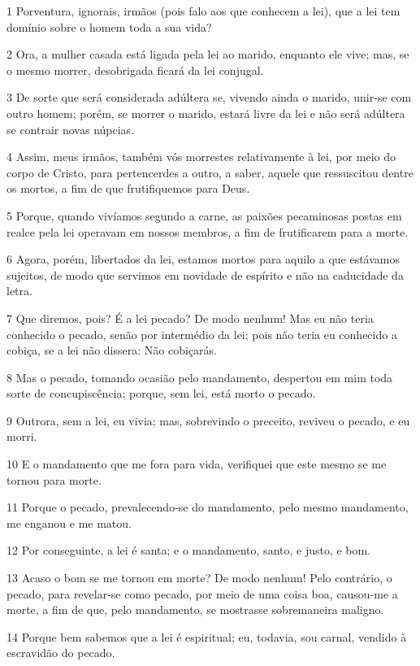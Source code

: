 \par 1 Porventura, ignorais, irmãos (pois falo aos que conhecem a lei), que a lei tem domínio sobre o homem toda a sua vida?
\par 2 Ora, a mulher casada está ligada pela lei ao marido, enquanto ele vive; mas, se o mesmo morrer, desobrigada ficará da lei conjugal.
\par 3 De sorte que será considerada adúltera se, vivendo ainda o marido, unir-se com outro homem; porém, se morrer o marido, estará livre da lei e não será adúltera se contrair novas núpcias.
\par 4 Assim, meus irmãos, também vós morrestes relativamente à lei, por meio do corpo de Cristo, para pertencerdes a outro, a saber, aquele que ressuscitou dentre os mortos, a fim de que frutifiquemos para Deus.
\par 5 Porque, quando vivíamos segundo a carne, as paixões pecaminosas postas em realce pela lei operavam em nossos membros, a fim de frutificarem para a morte.
\par 6 Agora, porém, libertados da lei, estamos mortos para aquilo a que estávamos sujeitos, de modo que servimos em novidade de espírito e não na caducidade da letra.
\par 7 Que diremos, pois? É a lei pecado? De modo nenhum! Mas eu não teria conhecido o pecado, senão por intermédio da lei; pois não teria eu conhecido a cobiça, se a lei não dissera: Não cobiçarás.
\par 8 Mas o pecado, tomando ocasião pelo mandamento, despertou em mim toda sorte de concupiscência; porque, sem lei, está morto o pecado.
\par 9 Outrora, sem a lei, eu vivia; mas, sobrevindo o preceito, reviveu o pecado, e eu morri.
\par 10 E o mandamento que me fora para vida, verifiquei que este mesmo se me tornou para morte.
\par 11 Porque o pecado, prevalecendo-se do mandamento, pelo mesmo mandamento, me enganou e me matou.
\par 12 Por conseguinte, a lei é santa; e o mandamento, santo, e justo, e bom.
\par 13 Acaso o bom se me tornou em morte? De modo nenhum! Pelo contrário, o pecado, para revelar-se como pecado, por meio de uma coisa boa, causou-me a morte, a fim de que, pelo mandamento, se mostrasse sobremaneira maligno.
\par 14 Porque bem sabemos que a lei é espiritual; eu, todavia, sou carnal, vendido à escravidão do pecado.
